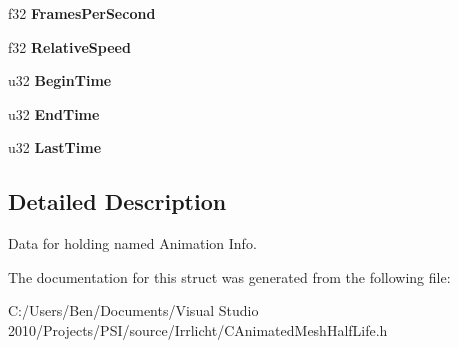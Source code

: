 \begin{DoxyCompactItemize}
\item 
\hypertarget{structirr_1_1scene_1_1_key_frame_interpolation_ae5070f76553f8a7bc638dd5704b78ec9}{f32 {\bfseries Frames\-Per\-Second}}\label{structirr_1_1scene_1_1_key_frame_interpolation_ae5070f76553f8a7bc638dd5704b78ec9}

\item 
\hypertarget{structirr_1_1scene_1_1_key_frame_interpolation_ad3fdafacd72c6052e863a6efdc0dbf98}{f32 {\bfseries Relative\-Speed}}\label{structirr_1_1scene_1_1_key_frame_interpolation_ad3fdafacd72c6052e863a6efdc0dbf98}

\item 
\hypertarget{structirr_1_1scene_1_1_key_frame_interpolation_a31fd4f0e496b98abfaffcad9b53c1e3e}{u32 {\bfseries Begin\-Time}}\label{structirr_1_1scene_1_1_key_frame_interpolation_a31fd4f0e496b98abfaffcad9b53c1e3e}

\item 
\hypertarget{structirr_1_1scene_1_1_key_frame_interpolation_a1a933fbfa7fff12ddb41ecfd3ee9a19d}{u32 {\bfseries End\-Time}}\label{structirr_1_1scene_1_1_key_frame_interpolation_a1a933fbfa7fff12ddb41ecfd3ee9a19d}

\item 
\hypertarget{structirr_1_1scene_1_1_key_frame_interpolation_a4d683b7c545698301fcaf4c72308b548}{u32 {\bfseries Last\-Time}}\label{structirr_1_1scene_1_1_key_frame_interpolation_a4d683b7c545698301fcaf4c72308b548}

\end{DoxyCompactItemize}


\subsection{Detailed Description}
Data for holding named Animation Info. 

The documentation for this struct was generated from the following file\-:\begin{DoxyCompactItemize}
\item 
C\-:/\-Users/\-Ben/\-Documents/\-Visual Studio 2010/\-Projects/\-P\-S\-I/source/\-Irrlicht/C\-Animated\-Mesh\-Half\-Life.\-h\end{DoxyCompactItemize}
